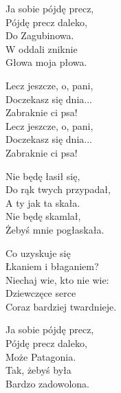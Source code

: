 \begin{text}
    Ja sobie pójdę precz,\\
    Pójdę precz daleko,\\
    Do Zagubinowa.\\
    W oddali zniknie\\
    Głowa moja płowa.

    \vin Lecz jeszcze, o, pani,\\
    \vin Doczekasz się dnia...\\
    \vin Zabraknie ci psa!\\
    \vin Lecz jeszcze, o, pani,\\
    \vin Doczekasz się dnia...\\
    \vin Zabraknie ci psa!

    Nie będę łasił się,\\
    Do rąk twych przypadał,\\
    A ty jak ta skała.\\
    Nie będę skamlał,\\
    Żebyś mnie pogłaskała.

    Co uzyskuje się\\
    Łkaniem i błaganiem?\\
    Niechaj wie, kto nie wie:\\
    Dziewczęce serce\\
    Coraz bardziej twardnieje.

    Ja sobie pójdę precz,\\
    Pójdę precz daleko,\\
    Może Patagonia.\\
    Tak, żebyś była\\
    Bardzo zadowolona.
\end{text}
\begin{chord}

\end{chord}